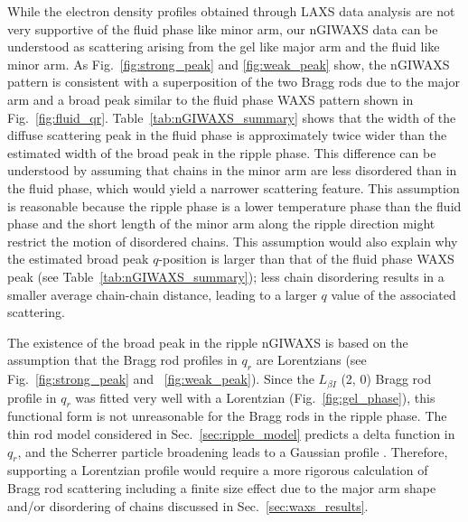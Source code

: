 While the electron density profiles obtained through LAXS data analysis
are not very supportive of the fluid phase like minor arm,
our nGIWAXS data can be understood as scattering
arising from the gel like major arm and the fluid like minor arm. 
As Fig.~\ref{fig:strong_peak} and \ref{fig:weak_peak} show,
the nGIWAXS pattern is consistent with a superposition of 
the two Bragg rods due to the major arm and
a broad peak similar to the fluid phase 
WAXS pattern shown in Fig.~\ref{fig:fluid_qr}. 
Table~\ref{tab:nGIWAXS_summary} shows that 
the width of the diffuse scattering peak 
in the fluid phase is approximately twice
wider 
than the estimated width of the broad peak in the ripple phase.
This difference can be understood by assuming that chains in the minor arm
are less disordered than in the fluid phase, which would yield a narrower
scattering feature. 
This assumption is reasonable because the ripple phase is a lower temperature
phase than the fluid phase and the short length of the minor arm along the 
ripple direction might restrict the motion of disordered chains. 
This assumption would also explain why the estimated broad peak
$q$-position is larger than that of the fluid phase WAXS peak
(see Table~\ref{tab:nGIWAXS_summary});
less chain disordering results in a smaller average chain-chain
distance, leading to a larger $q$ value of the associated scattering.

The existence of the broad peak in the ripple nGIWAXS is based on the
assumption that the Bragg rod profiles in $q_r$ are Lorentzians 
(see Fig.~\ref{fig:strong_peak} and ~\ref{fig:weak_peak}).
Since the $L_{\beta I}$ (2, 0) Bragg rod profile in $q_r$ was fitted very well
with a Lorentzian (Fig.~\ref{fig:gel_phase}), this functional form is
not unreasonable for the Bragg rods in the ripple phase.
The thin rod model considered in Sec.~\ref{sec:ripple_model} predicts
a delta function in $q_r$, and the Scherrer particle broadening leads to
a Gaussian profile \cite{ref:Warren69}. 
Therefore, supporting a Lorentzian profile would require
a more rigorous calculation of Bragg rod scattering including a finite size effect
due to the major arm shape and/or disordering of chains discussed in
Sec.~\ref{sec:waxs_results}. 


